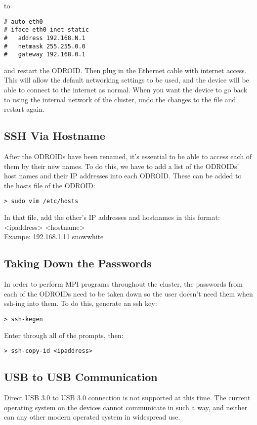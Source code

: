 to 

\begin{lstlisting}
# auto eth0
# iface eth0 inet static
#	address 192.168.N.1
#	netmask 255.255.0.0
#	gateway 192.168.0.1
\end{lstlisting}

and restart the ODROID. Then plug in the Ethernet cable with internet access. This will allow the default networking settings to be used, and the device will be able to connect to the internet as normal. When you want the device to go back to using the internal network of the cluster, undo the changes to the file and restart again.

\subsection{SSH Via Hostname}
After the ODROIDs have been renamed, it's essential to be able to access each of them by their new names. To do this, we have to add a list of the ODROIDs' host names and their IP addresses into each ODROID. These can be added to the hosts file of the ODROID:
\begin{lstlisting}
> sudo vim /etc/hosts
\end{lstlisting}
In that file, add the other's IP addresses and hostnames in this format: \\
<ipaddress> <hostname> \\
Exampe: 192.168.1.11 snow\textunderscore white
 
\subsection{Taking Down the Passwords}
In order to perform MPI programs throughout the cluster, the passwords from each of the ODROIDs need to be taken down so the user doesn't need them when ssh-ing into them. To do this, generate an ssh key:
\begin{lstlisting}
> ssh-kegen
\end{lstlisting}
Enter through all of the prompts, then:
\begin{lstlisting}
> ssh-copy-id <ipaddress>
\end{lstlisting}

\subsection{USB to USB Communication}

Direct USB 3.0 to USB 3.0 connection is not supported at this time. The current operating system on the devices cannot communicate in such a way, and neither can any other modern operated system in widespread use. 

